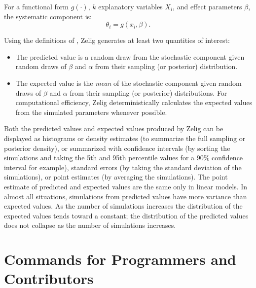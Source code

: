 For a functional form $g(\cdot)$, $k$ explanatory variables $X_i$, and
effect parameters $\beta$, the systematic component is:  
\begin{equation*}
\theta_i = g(x_i, \beta).
\end{equation*}

Using the definitions of ,
  \nocite{KinTomWit00}
Zelig generates at least two quantities of interest:   
\begin{itemize}
\item The predicted value is a random draw from the stochastic component
  given random draws of $\beta$ and $\alpha$ from their sampling (or
  posterior) distribution.  
\item The expected value is the \emph{mean} of the stochastic component
  given random draws of $\beta$ and $\alpha$ from their sampling (or
  posterior) distributions.  For computational efficiency, Zelig
  deterministically calculates the expected values from the simulated
  parameters whenever possible. 
\end{itemize}

Both the predicted values and expected values produced by Zelig can be
displayed as histograms or density estimates (to summarize the full
sampling or posterior density), or summarized with confidence
intervals (by sorting the simulations and taking the 5th and 95th
percentile values for a 90\% confidence interval for example),
standard errors (by taking the standard deviation of the simulations),
or point estimates (by averaging the simulations).  The point estimate
of predicted and expected values are the same only in linear models.
In almost all situations, simulations from predicted values have more
variance than expected values.  As the number of simulations increases
the distribution of the expected values tends toward a constant; the
distribution of the predicted values does not collapse as the number
of simulations increases.











\chapter{Commands for Programmers and Contributors}












